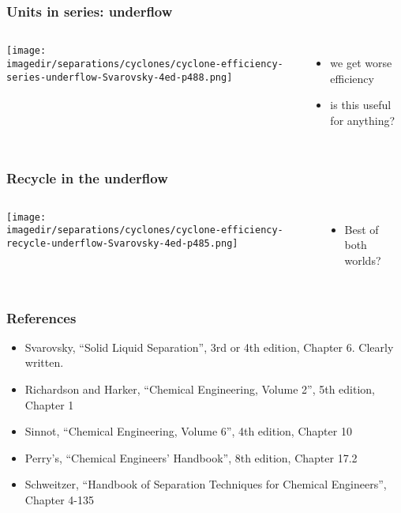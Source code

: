 \begin{frame}\frametitle{Units in series: underflow}
	\begin{columns}[t]
			\begin{center}
				\texttt{[image: \\imagedir/separations/cyclones/cyclone-efficiency-series-underflow-Svarovsky-4ed-p488.png]}
			\end{center}
		\begin{itemize}
			\item	we get worse efficiency
			\item	is this useful for anything?
		\end{itemize}
	\end{columns}
\end{frame}

\begin{frame}\frametitle{Recycle in the underflow}
	\begin{columns}[t]
			\begin{center}
				\texttt{[image: \\imagedir/separations/cyclones/cyclone-efficiency-recycle-underflow-Svarovsky-4ed-p485.png]}
			\end{center}
		\begin{itemize}
			\item	Best of both worlds?
		\end{itemize}
	\end{columns}	
\end{frame}


\begin{frame}\frametitle{References}
	\begin{itemize}
		\item	Svarovsky, ``Solid Liquid Separation'', 3rd or 4th edition, Chapter 6. Clearly written.
		\item	Richardson and Harker, ``Chemical Engineering, Volume 2'', 5th edition, Chapter 1
		\item	Sinnot, ``Chemical Engineering, Volume 6'', 4th edition, Chapter 10
		\item	Perry's, ``Chemical Engineers' Handbook'', 8th edition, Chapter 17.2
		\item	Schweitzer, ``Handbook of Separation Techniques for Chemical Engineers'', Chapter 4-135
	\end{itemize}
\end{frame}